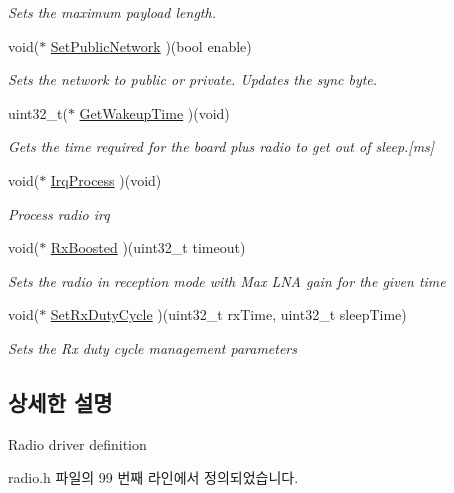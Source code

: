 \begin{DoxyCompactItemize}
\begin{DoxyCompactList}\small\item\em Sets the maximum payload length. \end{DoxyCompactList}\item 
void($\ast$ \mbox{\hyperlink{struct_radio__s_a2221e3fed07a50bc7437d1204a04a7ec}{Set\+Public\+Network}} )(bool enable)
\begin{DoxyCompactList}\small\item\em Sets the network to public or private. Updates the sync byte. \end{DoxyCompactList}\item 
uint32\+\_\+t($\ast$ \mbox{\hyperlink{struct_radio__s_aa6c05429af1a9f479d4720d95d0ee774}{Get\+Wakeup\+Time}} )(void)
\begin{DoxyCompactList}\small\item\em Gets the time required for the board plus radio to get out of sleep.\mbox{[}ms\mbox{]} \end{DoxyCompactList}\item 
void($\ast$ \mbox{\hyperlink{struct_radio__s_ae5865dd1b58fc4f6d086f2de5c993c02}{Irq\+Process}} )(void)
\begin{DoxyCompactList}\small\item\em Process radio irq \end{DoxyCompactList}\item 
void($\ast$ \mbox{\hyperlink{struct_radio__s_abb6a28b218d2e018c09f79449a5f4fd9}{Rx\+Boosted}} )(uint32\+\_\+t timeout)
\begin{DoxyCompactList}\small\item\em Sets the radio in reception mode with Max L\+NA gain for the given time \end{DoxyCompactList}\item 
void($\ast$ \mbox{\hyperlink{struct_radio__s_aa0ec8ed3a51984978c447f45a7699356}{Set\+Rx\+Duty\+Cycle}} )(uint32\+\_\+t rx\+Time, uint32\+\_\+t sleep\+Time)
\begin{DoxyCompactList}\small\item\em Sets the Rx duty cycle management parameters \end{DoxyCompactList}\end{DoxyCompactItemize}


\subsection{상세한 설명}
Radio driver definition 

radio.\+h 파일의 99 번째 라인에서 정의되었습니다.



